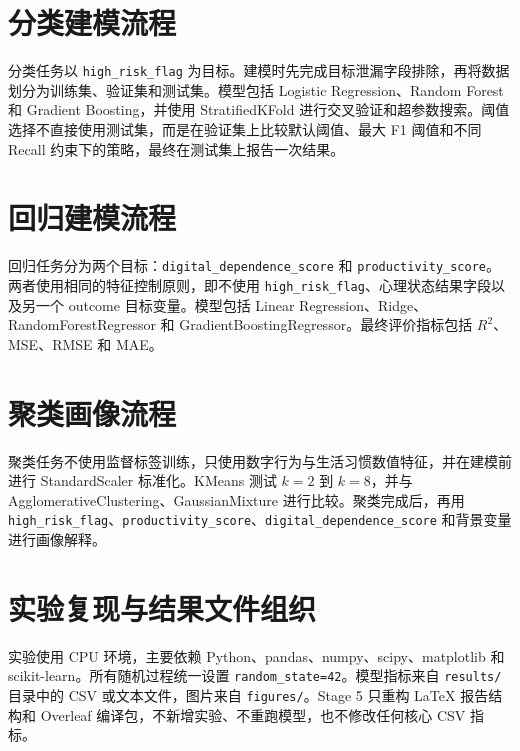 \section{分类建模流程}

分类任务以 \texttt{high\_risk\_flag} 为目标。建模时先完成目标泄漏字段排除，再将数据划分为训练集、验证集和测试集。模型包括 Logistic Regression、Random Forest 和 Gradient Boosting，并使用 StratifiedKFold 进行交叉验证和超参数搜索。阈值选择不直接使用测试集，而是在验证集上比较默认阈值、最大 F1 阈值和不同 Recall 约束下的策略，最终在测试集上报告一次结果。

\section{回归建模流程}

回归任务分为两个目标：\texttt{digital\_dependence\_score} 和 \texttt{productivity\_score}。两者使用相同的特征控制原则，即不使用 \texttt{high\_risk\_flag}、心理状态结果字段以及另一个 outcome 目标变量。模型包括 Linear Regression、Ridge、RandomForestRegressor 和 GradientBoostingRegressor。最终评价指标包括 $R^2$、MSE、RMSE 和 MAE。

\section{聚类画像流程}

聚类任务不使用监督标签训练，只使用数字行为与生活习惯数值特征，并在建模前进行 StandardScaler 标准化。KMeans 测试 $k=2$ 到 $k=8$，并与 AgglomerativeClustering、GaussianMixture 进行比较。聚类完成后，再用 \texttt{high\_risk\_flag}、\texttt{productivity\_score}、\texttt{digital\_dependence\_score} 和背景变量进行画像解释。

\section{实验复现与结果文件组织}

实验使用 CPU 环境，主要依赖 Python、pandas、numpy、scipy、matplotlib 和 scikit-learn。所有随机过程统一设置 \texttt{random\_state=42}。模型指标来自 \texttt{results/} 目录中的 CSV 或文本文件，图片来自 \texttt{figures/}。Stage 5 只重构 LaTeX 报告结构和 Overleaf 编译包，不新增实验、不重跑模型，也不修改任何核心 CSV 指标。
